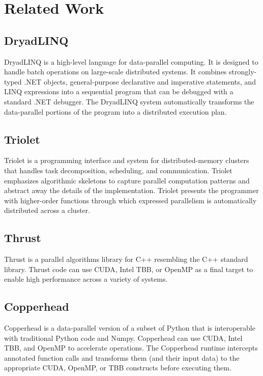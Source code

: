 \section*{Related Work}

\subsection*{DryadLINQ}
DryadLINQ\cite{yu2008dryadlinq} is a high-level language for data-parallel
computing. It is designed to handle batch operations on large-scale
distributed systems. It combines strongly-typed .NET objects,
general-purpose declarative and imperative statements, and LINQ expressions
into a sequential program that can be debugged with a standard .NET debugger.
The DryadLINQ system automatically transforms the data-parallel portions of the
program into a distributed execution plan.

\subsection*{Triolet}
Triolet\cite{rodrigues2014triolet} is a programming interface and system for
distributed-memory clusters that handles task decomposition, scheduling, and
communication. Triolet emphasizes algorithmic skeletons to capture parallel
computation patterns and abstract away the details of the implementation.
Triolet presents the programmer with higher-order functions through which
expressed parallelism is automatically distributed across a cluster.

\subsection*{Thrust}
Thrust\cite{thrust} is a parallel algorithms library for C++ resembling the C++
standard library. Thrust code can use CUDA, Intel TBB, or OpenMP as a final
target to enable high performance across a variety of systems.

\subsection*{Copperhead}
Copperhead\cite{copperhead} is a data-parallel version of a subset of Python
that is
interoperable with traditional Python code and Numpy. Copperhead can use CUDA,
Intel TBB, and OpenMP to accelerate operations. The Copperhead runtime
intercepts annotated function calls and transforms them (and their input data)
to the appropriate
CUDA, OpenMP, or TBB constructs before executing them.

